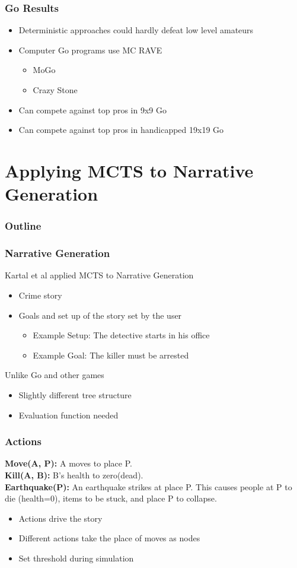 \documentclass{beamer}
\begin{document}
\begin{frame}
\frametitle{Go Results}
\begin{itemize}
	\item Deterministic approaches could hardly defeat low level amateurs
	\item Computer Go programs use MC RAVE
	\begin{itemize}
		\item MoGo
		\item Crazy Stone
	\end{itemize}
	\item Can compete against top pros in 9x9 Go
	\item Can compete against top pros in handicapped 19x19 Go
\end{itemize}
\end{frame}

\section{Applying MCTS to Narrative Generation}

\begin{frame}
\frametitle{Outline}
\tableofcontents[currentsection]
\end{frame}

\begin{frame}
\frametitle{Narrative Generation}
Kartal et al applied MCTS to Narrative Generation
\begin{itemize}
	\item Crime story
	\item Goals and set up of the story set by the user
	\begin{itemize}
		\item Example Setup: The detective starts in his office
		\item Example Goal: The killer must be arrested
	\end{itemize}
\end{itemize}
Unlike Go and other games
\begin{itemize}
	\item Slightly different tree structure
	\item Evaluation function needed
\end{itemize}
\end{frame}

\begin{frame}
\frametitle{Actions}
\textbf{Move(A, P):} A moves to place P. \\
\textbf{Kill(A, B):} B's health to zero(dead). \\
\textbf{Earthquake(P):} An earthquake strikes at place P. This causes people at P to die (health=0), items to be stuck, and place P to collapse.
\begin{itemize}
	\item Actions drive the story
	\item Different actions take the place of moves as nodes
	\item Set threshold during simulation
\end{itemize}
\end{frame}
\end{document}
